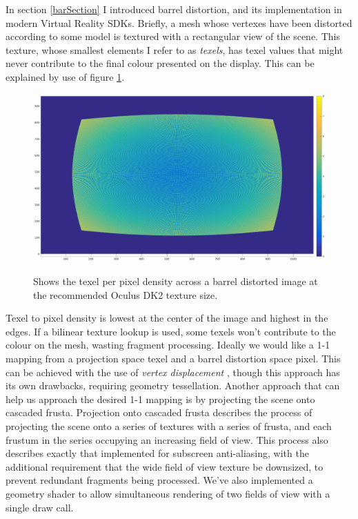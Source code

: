 \documentclass[12pt,a4paper,twoside,openright]{report}
\begin{document}
In section \ref{barSection} I introduced barrel distortion, and its implementation in modern Virtual Reality SDKs. Briefly, a mesh whose vertexes have been distorted according to some model is textured with a rectangular view of the scene. This texture, whose smallest elements I refer to as \emph{texels}, has texel values that might never contribute to the final colour presented on the display. This can be explained by use of figure \ref{fig:barreldensity1}.

\begin{figure}[tbh]
\begin{centering}
\includegraphics[width=12cm]{figs/oculus_pixel_density.eps}
\label{epsfig1}
 
\caption{Shows the texel per pixel density across a barrel distorted image at the recommended Oculus DK2 texture size.}
\label{fig:barreldensity1}
\end{centering}
\end{figure}

Texel to pixel density is lowest at the center of the image and highest in the edges. If a bilinear texture lookup is used, some texels won't contribute to the colour on the mesh, wasting fragment processing. Ideally we would like a 1-1 mapping from a projection space texel and a barrel distortion space pixel. This can be achieved with the use of \emph{vertex displacement} \cite{vertexDisplacement}, though this approach has its own drawbacks, requiring geometry tessellation. Another approach that can help us approach the desired 1-1 mapping is by projecting the scene onto cascaded frusta. Projection onto cascaded frusta describes the process of projecting the scene onto a series of textures with a series of frusta, and each frustum in the series occupying an increasing field of view.
This process also describes exactly that implemented for subscreen anti-aliasing, with the additional requirement that the wide field of view texture be downsized, to prevent redundant fragments being processed. We've also implemented a geometry shader to allow simultaneous rendering of two fields of view with a single draw call. 
\end{document}
